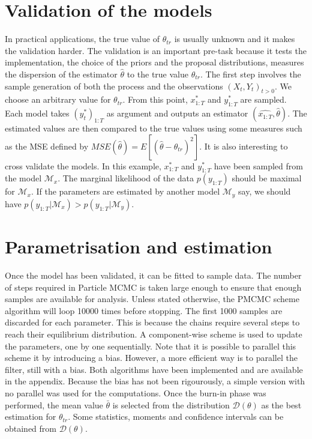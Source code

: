 \documentclass[11pt,a4,twosided,singlespacing,titlepagenumber=on]{scrreprt}
\numberwithin{equation}{chapter} %
\theoremstyle{remark}
\begin{document}
\section{Validation of the models}

\noindent
In practical applications, the true value of $\theta_{tr}$ is usually unknown and it makes the validation harder. The validation is an important pre-task because it tests the implementation, the choice of the priors and the proposal distributions, measures the dispersion of the estimator $\hat{\theta}$ to the true value $\theta_{tr}$. The first step involves the sample generation of both the process and the observations $(X_t, Y_t)_{t > 0}$. We choose an arbitrary value for $\theta_{tr}$. From this point, $x^*_{1:T}$ and $y^*_{1:T}$ are sampled. Each model takes $(y_t^*)_{1:T}$ as argument and outputs an estimator $(\hat{x_{1:T}}, \hat{\theta})$. The estimated values are then compared to the true values using some measures such as the MSE defined by $MSE(\hat{\theta}) = E[ ( \hat{\theta} - \theta_{tr} )^2 ]$. It is also interesting to cross validate the models. In this example, $x^*_{1:T}$ and $y^*_{1:T}$ have been sampled from the model $\mathcal{M}_x$. The marginal likelihood of the data $p(y_{1:T})$ should be maximal for $\mathcal{M}_x$. If the parameters are estimated by another model $\mathcal{M}_y$ say, we should have $p(y_{1:T} | \mathcal{M}_x) > p(y_{1:T} | \mathcal{M}_y)$.


\section{Parametrisation and estimation}

Once the model has been validated, it can be fitted to sample data. The number of steps required in Particle MCMC is taken large enough to ensure that enough samples are available for analysis. Unless stated otherwise, the PMCMC scheme algorithm will loop 10000 times before stopping. The first 1000 samples are discarded for each parameter. This is because the chains require several steps to reach their equilibrium distribution. A component-wise scheme is used to update the parameters, one by one sequentially. Note that it is possible to parallel this scheme it by introducing a bias. However, a more efficient way is to parallel the filter, still with a bias. Both algorithms have been implemented and are available in the appendix. Because the bias has not been rigourously, a simple version with no parallel was used for the computations. Once the burn-in phase was performed, the mean value $\bar{\theta}$ is selected from the distribution $\mathcal{D}(\theta)$ as the best estimation for $\theta_{tr}$. Some statistics, moments and confidence intervals can be obtained from $\mathcal{D}(\theta)$.
\end{document}
